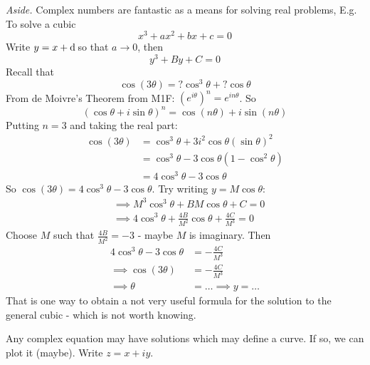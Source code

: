 \documentclass[10pt]{scrartcl}
\begin{document}
\emph{Aside.} Complex numbers are fantastic as a means for solving real problems, E.g. To solve a cubic 
\[
  x^3 + ax^2 + bx + c = 0
\]
Write $y=  x+ \d$ so that $a \to 0$, then 
\[
  y^3 + By + C = 0
\]
Recall that
\[
  \cos(3\theta) = ?\cos^3\theta + ?\cos\theta 
\]
From de Moivre's Theorem from M1F: $(e^{i\theta})^n = e^{in\theta}$. So
\[
  (\cos\theta + i\sin\theta)^n = \cos(n\theta) + i\sin(n\theta)
\]
Putting $n =3$ and taking the real part: 
\begin{align*}
  \cos(3\theta) &= \cos^3\theta + 3i^2\cos\theta(\sin\theta)^2\\
  &= \cos^3\theta - 3\cos\theta(1-\cos^2\theta)\\
  &= 4\cos^3\theta - 3\cos\theta 
\end{align*}
So $\cos(3\theta) = 4\cos^3\theta - 3\cos\theta$. Try writing $y = M\cos\theta$:
\begin{align*}
  &\implies M^3\cos^3\theta + BM\cos\theta + C = 0\\
  &\implies 4\cos^3\theta + \frac{4B}{M^2}\cos\theta + \frac{4C}{M^3} = 0
\end{align*}
Choose $M$ such that $\frac{4B}{M^2} = -3$ - maybe $M$ is imaginary. Then
\begin{align*}
  4\cos^3\theta - 3\cos\theta &= -\frac{4C}{M^3}\\
  \implies \cos(3\theta) &= -\frac{4C}{M^3}\\
  \implies \theta &= \dots \implies y = \dots
\end{align*}
That is one way to obtain a not very useful formula for the solution to the general cubic - which is not worth knowing. 

Any complex equation may have solutions which may define a curve. If so, we can plot it (maybe). Write $z = x+iy$.\\
\end{document}
